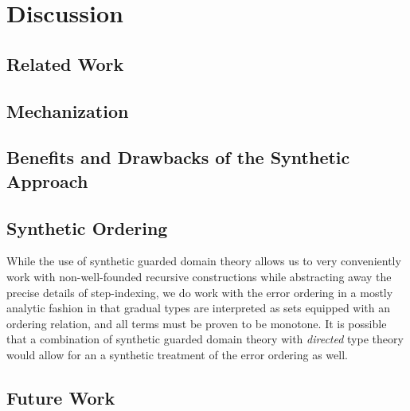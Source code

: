 \section{Discussion}

\subsection{Related Work}

\subsection{Mechanization}

\subsection{Benefits and Drawbacks of the Synthetic Approach}

\subsection{Synthetic Ordering}

While the use of synthetic guarded domain theory allows us to very
conveniently work with non-well-founded recursive constructions while
abstracting away the precise details of step-indexing, we do work with
the error ordering in a mostly analytic fashion in that gradual types
are interpreted as sets equipped with an ordering relation, and all
terms must be proven to be monotone.
%
It is possible that a combination of synthetic guarded domain theory
with \emph{directed} type theory would allow for an a synthetic
treatment of the error ordering as well.

\subsection{Future Work}

